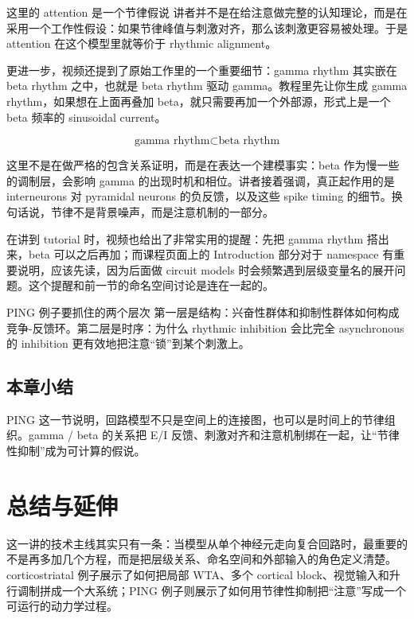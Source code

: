 \documentclass[a4paper]{article}
\begin{document}
\begin{knowledgebox}{这里的 attention 是一个节律假说}
讲者并不是在给注意做完整的认知理论，而是在采用一个工作性假设：如果节律峰值与刺激对齐，那么该刺激更容易被处理。于是 attention 在这个模型里就等价于 rhythmic alignment。
\end{knowledgebox}

更进一步，视频还提到了原始工作里的一个重要细节：gamma rhythm 其实嵌在 beta rhythm 之中，也就是 beta rhythm 驱动 gamma。教程里先让你生成 gamma rhythm，如果想在上面再叠加 beta，就只需要再加一个外部源，形式上是一个 beta 频率的 sinusoidal current。

\begin{equation}
\text{gamma rhythm} \subset \text{beta rhythm}
\end{equation}

这里不是在做严格的包含关系证明，而是在表达一个建模事实：beta 作为慢一些的调制层，会影响 gamma 的出现时机和相位。讲者接着强调，真正起作用的是 interneurons 对 pyramidal neurons 的负反馈，以及这些 spike timing 的细节。换句话说，节律不是背景噪声，而是注意机制的一部分。

在讲到 tutorial 时，视频也给出了非常实用的提醒：先把 gamma rhythm 搭出来，beta 可以之后再加；而课程页面上的 Introduction 部分对于 namespace 有重要说明，应该先读，因为后面做 circuit models 时会频繁遇到层级变量名的展开问题。这个提醒和前一节的命名空间讨论是连在一起的。

\begin{importantbox}{PING 例子要抓住的两个层次}
第一层是结构：兴奋性群体和抑制性群体如何构成竞争-反馈环。第二层是时序：为什么 rhythmic inhibition 会比完全 asynchronous 的 inhibition 更有效地把注意“锁”到某个刺激上。
\end{importantbox}

\subsection{本章小结}
PING 这一节说明，回路模型不只是空间上的连接图，也可以是时间上的节律组织。gamma / beta 的关系把 E/I 反馈、刺激对齐和注意机制绑在一起，让“节律性抑制”成为可计算的假说。

\section{总结与延伸}
这一讲的技术主线其实只有一条：当模型从单个神经元走向复合回路时，最重要的不是再多加几个方程，而是把层级关系、命名空间和外部输入的角色定义清楚。corticostriatal 例子展示了如何把局部 WTA、多个 cortical block、视觉输入和升行调制拼成一个大系统；PING 例子则展示了如何用节律性抑制把“注意”写成一个可运行的动力学过程。
\end{document}
